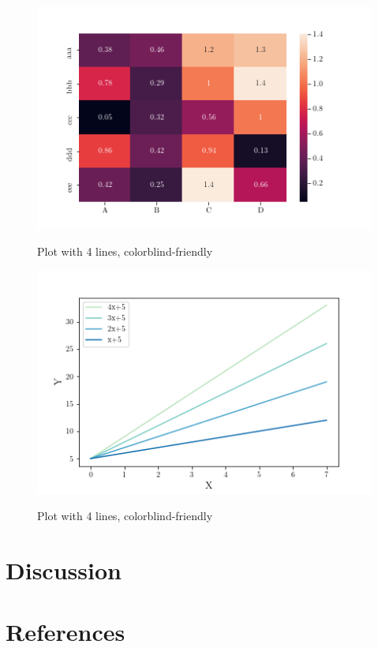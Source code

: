 \documentclass{article}
\begin{document}
\newpage



\newpage

\newpage


\begin{figure} [!h]
	\caption{Plot with 4 lines, colorblind-friendly}
	\begin{centering}
		\includegraphics[width=0.8\linewidth]{heatmap} \\
	\end{centering}
\end{figure}



\begin{figure}[!h]
	\caption{Plot with 4 lines, colorblind-friendly}
	\begin{centering}
		\includegraphics[width=0.8\linewidth]{color_blind_friendly_palette} \\
	\end{centering}
\end{figure}



\newpage


\section{Discussion}

\blindtext

\newpage







\section{References}
\begingroup
\renewcommand{\section}[2]{}
\nocite{*}
\printbibliography
\endgroup

\newpage
\end{document}

